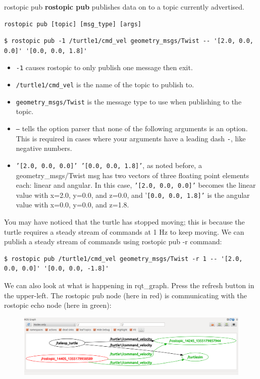 \begin{frame}{rostopic pub}
\textbf{rostopic pub} publishes data on to a topic currently advertised.

\begin{lstlisting}[language=syntax]
rostopic pub [topic] [msg_type] [args]
\end{lstlisting}

\begin{lstlisting}[language=shell]
$ rostopic pub -1 /turtle1/cmd_vel geometry_msgs/Twist -- '[2.0, 0.0, 0.0]' '[0.0, 0.0, 1.8]'
\end{lstlisting}

\begin{itemize}
 \item \texttt{-1} causes rostopic to only publish one message then exit.
 \item \texttt{/turtle1/cmd\_vel} is the name of the topic to publish to.
 \item \texttt{geometry\_msgs/Twist} is the message type to use when publishing to the topic.
 \item \texttt{--} tells the option parser that none of the following arguments is an option. This is required in cases where your arguments have a leading dash \texttt{-}, like negative numbers.
 \item \texttt{'[2.0, 0.0, 0.0]' '[0.0, 0.0, 1.8]'}, as noted before, a geometry\_msgs/Twist msg has two vectors of three floating point elements each: linear and angular. In this case, \texttt{'[2.0, 0.0, 0.0]'} becomes the linear value with x=2.0, y=0.0, and z=0.0, and '\texttt{[0.0, 0.0, 1.8]'} is the angular value with x=0.0, y=0.0, and z=1.8.
\end{itemize}

\framebreak

You may have noticed that the turtle has stopped moving; this is because the turtle requires a steady stream of commands at 1 Hz to keep moving. We can publish a steady stream of commands using rostopic pub -r command:

\begin{lstlisting}[language=shell]
$ rostopic pub /turtle1/cmd_vel geometry_msgs/Twist -r 1 -- '[2.0, 0.0, 0.0]' '[0.0, 0.0, -1.8]'
\end{lstlisting}

We can also look at what is happening in rqt\_graph. Press the refresh button in the upper-left. The rostopic pub node (here in red) is communicating with the rostopic echo node (here in green):
\begin{figure}
\includegraphics[width=.8\textwidth]{./img/ros/rqt_graph_pub.png}
\end{figure}
\end{frame}


